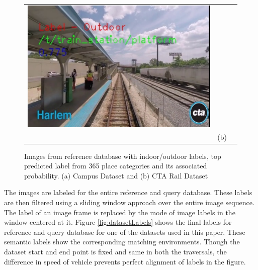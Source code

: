 \documentclass[twocolumn]{article}
\begin{document}
\begin{figure}[!htbp]
\begin{tabular*}{\textwidth}{lcr}
  \includegraphics[scale=\scaleVal]{8-trainStation} \\
  & (b) &
 \end{tabular*}
 \caption{Images from reference database with indoor/outdoor labels, top predicted label from 365 place categories and its associated probability. (a) Campus Dataset and (b) CTA Rail Dataset}
 \label{fig:labelledImages}
\end{figure}

The images are labeled for the entire reference and query database. These labels are then filtered using a sliding window approach over the entire image sequence. The label of an image frame is replaced by the mode of image labels in the window centered at it. Figure \ref{fig:datasetLabels} shows the final labels for reference and query database for one of the datasets used in this paper. These semantic labels show the corresponding matching environments. Though the dataset start and end point is fixed and same in both the traversals, the difference in speed of vehicle prevents perfect alignment of labels in the figure.
\end{document}
